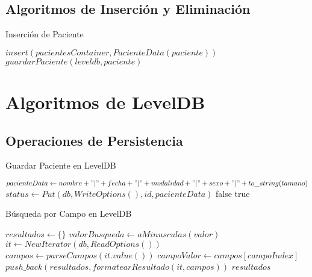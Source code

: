 \documentclass[12pt]{article}
\begin{document}
	\subsection*{Algoritmos de Inserción y Eliminación}
	
	\begin{algorithm}[H]
		\caption{Inserción de Paciente}
		\begin{algorithmic}[1]
			\State \Return {}
			\EndIf
			\State $insert(pacientesContainer, PacienteData(paciente))$
			\State $guardarPaciente(leveldb, paciente)$
			\EndIf
			\EndFunction
		\end{algorithmic}
	\end{algorithm}
	
	\section{Algoritmos de LevelDB}
	
	\subsection*{Operaciones de Persistencia}
	
	\begin{algorithm}[H]
		\caption{Guardar Paciente en LevelDB}
		\begin{algorithmic}[1]
			\State $pacienteData \gets nombre + "|" + fecha + "|" + modalidad + "|" + sexo + "|" + to\_string(tamano)$
			\State $status \gets Put(db, WriteOptions(), id, pacienteData)$
			\State \Return false
			\EndIf
			\State \Return true
			\EndFunction
		\end{algorithmic}
	\end{algorithm}
	
	\begin{algorithm}[H]
		\caption{Búsqueda por Campo en LevelDB}
		\begin{algorithmic}[1]
			\State $resultados \gets \{\}$
			\State $valorBusqueda \gets aMinusculas(valor)$
			\State $it \gets NewIterator(db, ReadOptions())$
			\State $campos \gets parseCampos(it.value())$
			\State $campoValor \gets campos[campoIndex]$
			\State $push\_back(resultados, formatearResultado(it, campos))$
			\EndIf
			\EndIf
			\EndFor
			\State \Return $resultados$
			\EndFunction
		\end{algorithmic}
	\end{algorithm}
	
\end{document}
